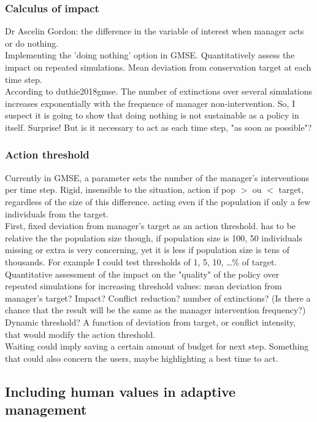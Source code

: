 \documentclass[12pt,a4paper]{article}
\begin{document}
\subsubsection{Calculus of impact}
Dr Ascelin Gordon: the difference in the variable of interest when manager acts or do nothing.\\
Implementing the 'doing nothing' option in GMSE. Quantitatively assess the impact on repeated simulations. Mean deviation from conservation target at each time step.\\
According to duthie2018gmse. The number of extinctions over several simulations increases exponentially with the frequence of manager non-intervention. So, I suspect it is going to show that doing nothing is not sustainable as a policy in itself. Surprise!
But is it necessary to act as each time step, "as soon as possible"?

\subsubsection{Action threshold}
Currently in GMSE, a parameter sets the number of the manager's interventions per time step. Rigid, insensible to the situation, action if pop $>$ ou $<$ target, regardless of the size of this difference. acting even if the population if only a few individuals from the target.\\
First, fixed deviation from manager's target as an action threshold. has to be relative the the population size though, if population size is 100, 50 individuals missing or extra is very concerning, yet it is less if population size is tens of thousands. For example I could test thresholds of 1, 5, 10, \dots \% of target.\\ 
Quantitative assessment of the impact on the "quality" of the policy over repeated simulations for increasing threshold values: mean deviation from manager's target? Impact? Conflict reduction? number of extinctions? (Is there a chance that the result will be the same as the manager intervention frequency?)\\
Dynamic threshold? A function of deviation from target, or conflict intensity, that would modify the action threshold.\\
Waiting could imply saving a certain amount of budget for next step. Something that could also concern the users, maybe highlighting a best time to act.

\subsection{Including human values in adaptive management}
\end{document}
